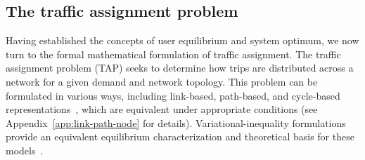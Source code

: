 \documentclass[twocolumn,english,groupedaddress, superscriptaddress,aps,pre,10pt,floatfix]{revtex4-2}
\begin{document}
\subsection{The traffic assignment problem}
Having established the concepts of user equilibrium and system optimum, we now turn to the formal mathematical formulation of traffic assignment. The traffic assignment problem (TAP) seeks to determine how trips are distributed across a network for a given demand and network topology. This problem can be formulated in various ways, including link-based, path-based, and cycle-based representations~\cite{ahuja1995network}, which are equivalent under appropriate conditions (see Appendix~\ref{app:link-path-node} for details). Variational-inequality formulations provide an equivalent equilibrium characterization and theoretical basis for these models~\cite{dafermos1980traffic}.\\
\end{document}
